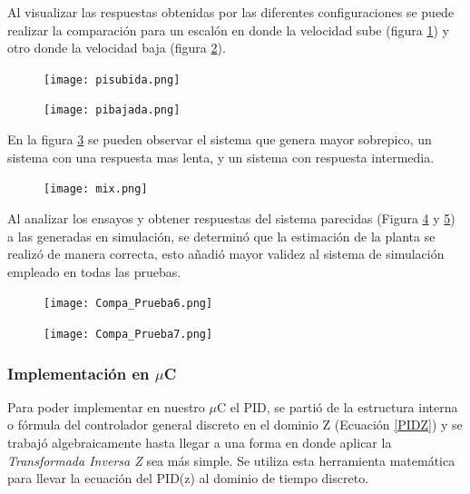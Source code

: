     Al visualizar las respuestas obtenidas por las diferentes configuraciones se puede realizar la comparación para un escalón en donde la velocidad sube (figura \ref{fig:pisubuda}) y otro donde la velocidad baja (figura \ref{fig:pibajada}).
    
    \begin{figure}[H]
    	\centering
    	\texttt{[image: pisubida.png]}
    	\label{fig:pisubuda}
    \end{figure}
    
    \begin{figure}[H]
    	\centering
    	\texttt{[image: pibajada.png]}
    	\label{fig:pibajada}
    \end{figure}
    
    
    En la figura \ref{fig:mix} se pueden observar el sistema que genera mayor sobrepico, un sistema con una respuesta mas lenta, y un sistema con respuesta intermedia. 
    \begin{figure}[H]
    	\centering
    	\texttt{[image: mix.png]}
    	\label{fig:mix}
    \end{figure}

	Al analizar los ensayos y obtener respuestas del sistema parecidas (Figura \ref{fig:Prueba_6} y \ref{fig:Prueba_7}) a las generadas en simulación, se determinó que la estimación de la planta se realizó de manera correcta, esto añadió mayor validez al sistema de simulación empleado en todas las pruebas. 
	
	\begin{figure}[H]
		\centering
		\texttt{[image: Compa\_Prueba6.png]}
		\label{fig:Prueba_6}
	\end{figure}   
\begin{figure}[H]
	\centering
	\texttt{[image: Compa\_Prueba7.png]}
	\label{fig:Prueba_7}
\end{figure}   
    \subsubsection{Implementación en $\mu$C}
    
    Para poder implementar en nuestro $\mu$C  el PID, se partió de la estructura interna o fórmula del controlador general discreto en el dominio Z (Ecuación \ref{PIDZ}) y se trabajó algebraicamente hasta llegar a una forma en donde aplicar la \textit{Transformada Inversa Z} sea más simple. Se utiliza esta herramienta matemática para llevar la ecuación del PID(z) al dominio de tiempo discreto.
    
